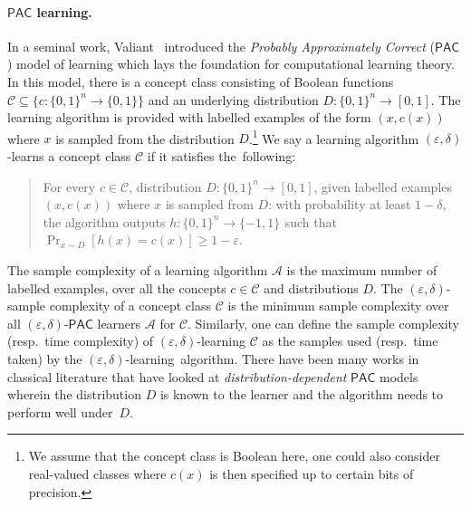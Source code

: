 \documentclass[11pt]{article}
\newcommand{\Cc}{\ensuremath{\mathcal{C}}}
\def\01{\{0,1\}}
\newcommand{\pmset}[1]{\{-1,1\}^{#1}} %
\newcommand{\A}{\ensuremath{\mathcal{A}}}
\newcommand{\PAC}{\ensuremath{\mathsf{PAC}}}
\def\01{\{0,1\}}
\begin{document}
\paragraph{$\PAC$ learning.} In a seminal work, Valiant~\cite{DBLP:journals/cacm/Valiant84} introduced the \emph{Probably Approximately Correct} ($\PAC$)  model of learning which lays the foundation for computational learning theory.  In this model, there is a concept class consisting of Boolean functions  $\Cc\subseteq \{c:\01^n\rightarrow \01\}$ and an underlying distribution $D:\01^n\rightarrow [0,1]$. The learning algorithm is provided with labelled examples of the form $(x,c(x))$ where $x$ is sampled from the distribution $D$.\footnote{We assume that the concept class is Boolean here, one could also consider real-valued classes where $c(x)$ is then specified up to certain bits of precision.} We say a learning algorithm $(\varepsilon,\delta)$-learns a concept class $\Cc$ if it satisfies the~following:
\begin{quote}
    For every $c\in \Cc$, distribution $D:\01^n\rightarrow [0,1]$, given labelled examples $(x,c(x))$ where $x$ is sampled from $D$: with probability at least $1-\delta$, the algorithm outputs $h:\01^n\rightarrow \pmset{}$ such that $\Pr_{x\sim D} [h(x)= c(x)]\geq 1-\varepsilon$.
\end{quote}
The sample complexity of a learning algorithm $\A$ is the maximum number of labelled examples,  over all the concepts $c\in \Cc$ and distributions $D$.   The $(\varepsilon,\delta)$-sample complexity of a concept class $\Cc$ is the minimum sample complexity over all $(\varepsilon,\delta)$-$\PAC$ learners $\A$ for $\Cc$. Similarly, one can define the sample complexity (resp.~time complexity)  of $(\varepsilon,\delta)$-learning $\Cc$  as the samples used (resp.~time taken) by the $(\varepsilon,\delta)$-learning~algorithm. There have been many works in classical literature that have looked at \emph{distribution-dependent} $\PAC$ models wherein the distribution $D$ is known to the learner and the algorithm needs to perform well under~$D$. 
\end{document}
